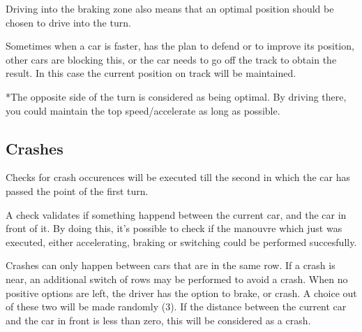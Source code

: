Driving into the braking zone also means that an optimal position should be chosen to drive into the turn.

Sometimes when a car is faster, has the plan to defend or to improve its position, other cars are blocking this, or the car needs to go off the track to obtain the result. In this case the current position on track will be maintained.

*The opposite side of the turn is considered as being optimal. By driving there, you could maintain the top speed/accelerate as long as possible.

\subsection{Crashes}
Checks for crash occurences will be executed till the second in which the car has passed the point of the first turn.

A check validates if something happend between the current car, and the car in front of it. By doing this, it's possible to check if the manouvre which just was executed, either accelerating, braking or switching could be performed succesfully.

Crashes can only happen between cars that are in the same row. If a crash is near, an additional switch of rows may be performed to avoid a crash. When no positive options are left, the driver has the option to brake, or crash. A choice out of these two will be made randomly (3). If the distance between the current car and the car in front is less than zero, this will be considered as a crash.

